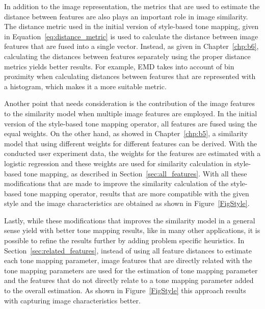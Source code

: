 In addition to the image representation, the metrics that are used to estimate the distance between features are also plays an important role in image similarity. The distance metric used in the initial version of style-based tone mapping, given in Equation~\ref{eq:distance_metric} is used to calculate the distance between image features that are fused into a single vector. Instead, as given in Chapter~\ref{chp:b6}, calculating the distances between features separately using the proper distance metrics yields better results. For example, EMD takes into account of bin proximity when calculating distances between features that are represented with a histogram, which makes it a more suitable metric.

Another point that needs consideration is the contribution of the image features to the similarity model when multiple image features are employed. In the initial version of the style-based tone mapping operator, all features are fused using the equal weights. On the other hand, as showed in Chapter~\ref{chp:b5}, a similarity model that using different weights for different features can be derived. With the conducted user experiment data, the weights for the features are estimated with a logistic regression and these weights are used for similarity calculation in style-based tone mapping, as described in Section~\ref{sec:all_features}. With all these modifications that are made to improve the similarity calculation of the style-based tone mapping operator, results that are more compatible with the given style and the image characteristics are obtained as shown in Figure~\ref{FigStyle}. 

Lastly, while these modifications that improves the similarity model in a general sense yield with better tone mapping results, like in many other applications, it is possible to refine the results further by adding problem specific heuristics. In Section~\ref{sec:related_features}, instead of using all feature distances to estimate each tone mapping parameter, image features that are directly related with the tone mapping parameters are used for the estimation of tone mapping parameter and the features that do not directly relate to a tone mapping parameter added to the overall estimation. As shown in Figure~\ref{FigStyle} this approach results with capturing image characteristics better.  
